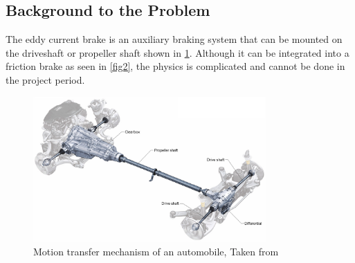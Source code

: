 \documentclass[lettersize,journal]{IEEEtran}
\begin{document}
\subsection{Background to the Problem}
The eddy current brake is an auxiliary braking system that can be mounted on the driveshaft or propeller shaft shown in \ref{fig1}. Although it can be integrated into a friction brake as seen in \ref{fig2}, the physics is complicated and cannot be done in the project period. 
\begin{figure}[!t]
\centering
\includegraphics[width=3.5in]{images/fig1.jpg}
\caption{Motion transfer mechanism of an automobile, Taken from \cite{takawane_2019_car}}
\label{fig1}
\end{figure}
\end{document}
